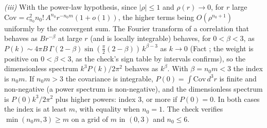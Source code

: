 \emph{(iii)} With the power-law hypothesis, since $|\rho| \le 1$ and $\rho(r) \to 0$, for $r$ large $\mathrm{Cov} = c_{n_{0}}^{2}n_{0}!\,A^{n_{0}}r^{-n_{0}m}(1 + o(1))$, the higher terms being $O(\rho^{n_{0}+1})$ uniformly by the convergent sum. The Fourier transform of a correlation that behaves as $B r^{-\beta}$ at large $r$ (and is locally integrable) behaves, for $0 < \beta < 3$, as $P(k) \sim 4\pi B\,\Gamma(2 - \beta)\sin(\tfrac{\pi}{2}(2 - \beta))\,k^{\beta - 3}$ as $k \to 0$ (Fact ; the weight is positive on $0 < \beta < 3$, as the check's sign table by intervals confirms), so the dimensionless spectrum $k^{3}P(k)/2\pi^{2}$ behaves as $k^{\beta}$. With $\beta = n_{0}m < 3$ the index is $n_{0}m$. If $n_{0}m > 3$ the covariance is integrable, $P(0) = \int \mathrm{Cov}\,d^{3}r$ is finite and non-negative (a power spectrum is non-negative), and the dimensionless spectrum is $P(0)k^{3}/2\pi^{2}$ plus higher powers: index $3$, or more if $P(0) = 0$. In both cases the index is at least $m$, with equality when $n_{0} = 1$. The check verifies $\min(n_{0}m, 3) \ge m$ on a grid of $m$ in $(0, 3)$ and $n_{0} \le 6$.

